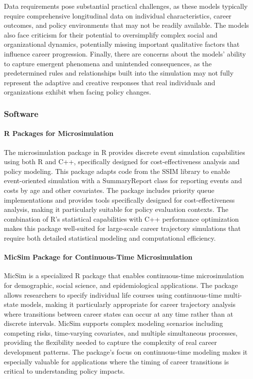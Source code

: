 \documentclass[main.tex]{subfiles}
\begin{document}
Data requirements pose substantial practical challenges, as these models typically require comprehensive longitudinal data on individual characteristics, career outcomes, and policy environments that may not be readily available\autocite{duc2015, bronka2023}. The models also face criticism for their potential to oversimplify complex social and organizational dynamics, potentially missing important qualitative factors that influence career progression\autocite{wilensky2023}. Finally, there are concerns about the models' ability to capture emergent phenomena and unintended consequences, as the predetermined rules and relationships built into the simulation may not fully represent the adaptive and creative responses that real individuals and organizations exhibit when facing policy changes\autocite{number-analytics1, furtado2023}.

\subsubsection{Software}

\paragraph{R Packages for Microsimulation}

The microsimulation package in R provides discrete event simulation capabilities using both R and C++, specifically designed for cost-effectiveness analysis and policy modeling\autocite{microsimulation-r}. This package adapts code from the SSIM library to enable event-oriented simulation with a SummaryReport class for reporting events and costs by age and other covariates. The package includes priority queue implementations and provides tools specifically designed for cost-effectiveness analysis, making it particularly suitable for policy evaluation contexts. The combination of R's statistical capabilities with C++ performance optimization makes this package well-suited for large-scale career trajectory simulations that require both detailed statistical modeling and computational efficiency.

\paragraph{MicSim Package for Continuous-Time Microsimulation}

MicSim is a specialized R package that enables continuous-time microsimulation for demographic, social science, and epidemiological applications\autocite{micsim}. The package allows researchers to specify individual life courses using continuous-time multi-state models, making it particularly appropriate for career trajectory analysis where transitions between career states can occur at any time rather than at discrete intervals. MicSim supports complex modeling scenarios including competing risks, time-varying covariates, and multiple simultaneous processes, providing the flexibility needed to capture the complexity of real career development patterns. The package's focus on continuous-time modeling makes it especially valuable for applications where the timing of career transitions is critical to understanding policy impacts.
\end{document}
